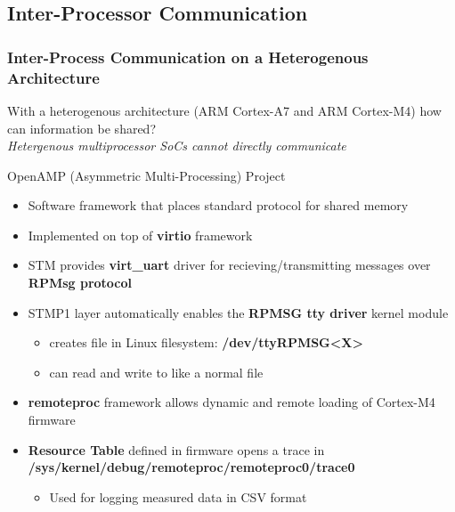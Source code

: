 \documentclass[8pt,compress]{beamer}
\newcommand\LightBold[1]{\textcolor{VSBlueLight}{\textbf{#1}}}
\newcommand\DarkBoldP[1]{\textcolor{VSPurpleDark}{\textbf{#1}}}
\begin{document}
\subsection{Inter-Processor Communication}
\begin{frame}
  \frametitle{Inter-Process Communication on a Heterogenous Architecture}
  With a heterogenous architecture (ARM Cortex-A7 and ARM Cortex-M4) how can information be shared?\\
  {\em \scriptsize Hetergenous multiprocessor SoCs cannot directly communicate }
  \break
  \begin{minipage}{0.465\textwidth}
    \begin{block}{OpenAMP (Asymmetric Multi-Processing) Project}
      \footnotesize
      \begin{itemize}
        \item Software framework that places standard protocol for shared memory
        \item Implemented on top of \DarkBoldP{virtio} framework
        \item STM provides \DarkBoldP{virt\_uart} driver for recieving/transmitting messages
          over \DarkBoldP{RPMsg protocol}
        \item STMP1 layer automatically enables the \DarkBoldP{RPMSG tty driver} kernel module
          \begin{itemize}
              \tiny
            \item creates file in Linux filesystem: \DarkBoldP{/dev/ttyRPMSG<X>}
            \item can read and write to like a normal file
          \end{itemize}
        \item \DarkBoldP{remoteproc} framework allows dynamic and remote loading of Cortex-M4 firmware
        \item \LightBold{Resource Table} defined in firmware opens a trace in\\
          {\scriptsize\DarkBoldP{/sys/kernel/debug/remoteproc/remoteproc0/trace0}}
          \begin{itemize}
              \tiny
            \item Used for logging measured data in CSV format
          \end{itemize}
      \end{itemize}

\end{block}
\end{minipage}
\end{frame}
\end{document}
